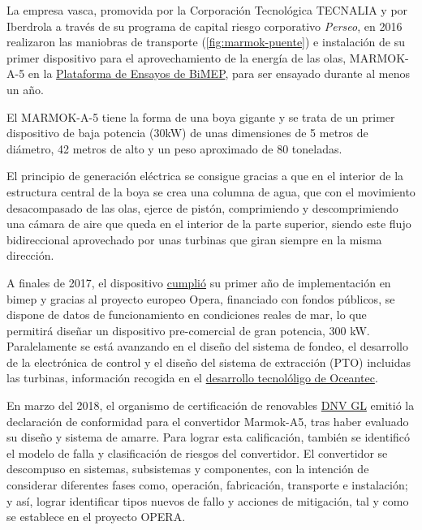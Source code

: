 \begin{itemize}
  La empresa vasca, promovida por la Corporación Tecnológica TECNALIA y
  por Iberdrola a través de su programa de capital riesgo corporativo
  \emph{Perseo}, en 2016 realizaron las maniobras de transporte (\autoref{fig:marmok-puente}) e
  instalación de su primer dispositivo para el aprovechamiento de la
  energía de las olas, MARMOK-A-5 en la
  \href{http://bimep.com/}{Plataforma de Ensayos de BiMEP}, para ser
  ensayado durante al menos un año.



  El MARMOK-A-5 tiene la forma de una boya gigante y se trata de un
  primer dispositivo de baja potencia (30kW) de unas dimensiones de 5
  metros de diámetro, 42 metros de alto y un peso aproximado de 80
  toneladas.

  El principio de generación eléctrica se consigue gracias a que en el
  interior de la estructura central de la boya se crea una columna de
  agua, que con el movimiento desacompasado de las olas, ejerce de
  pistón, comprimiendo y descomprimiendo una cámara de aire que queda en
  el interior de la parte superior, siendo este flujo bidireccional
  aprovechado por unas turbinas que giran siempre en la misma dirección.

  A finales de 2017, el dispositivo
  \href{https://tidalenergytoday.com/2017/12/15/wave-device-at-bimep-marks-power-export-anniversary/}{cumplió}
  su primer año de implementación en bimep y gracias al proyecto europeo
  Opera, financiado con fondos públicos, se dispone de datos de
  funcionamiento en condiciones reales de mar, lo que permitirá diseñar
  un dispositivo pre-comercial de gran potencia, 300 kW. Paralelamente
  se está avanzando en el diseño del sistema de fondeo, el desarrollo de
  la electrónica de control y el diseño del sistema de extracción (PTO)
  incluidas las turbinas, información recogida en el
  \href{http://www.oceantecenergy.com/}{desarrollo tecnolóligo de
  Oceantec}.

  En marzo del 2018, el organismo de certificación de renovables
  \href{https://www.dnvgl.com/energy/generation/renewables-certification/index.html}{DNV
  GL} emitió la declaración de conformidad para el convertidor
  Marmok-A5, tras haber evaluado su diseño y sistema de amarre. Para
  lograr esta calificación, también se identificó el modelo de falla y
  clasificación de riesgos del convertidor. El convertidor se descompuso
  en sistemas, subsistemas y componentes, con la intención de considerar
  diferentes fases como, operación, fabricación, transporte e
  instalación; y así, lograr identificar tipos nuevos de fallo y
  acciones de mitigación, tal y como se establece en el proyecto OPERA.


\end{itemize}
